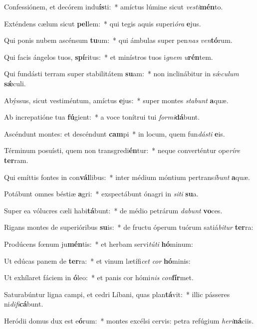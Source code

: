 \item Confessiónem, et decórem indu\textbf{ís}ti:~* amíctus lúmine sicut \textit{ves}\textit{ti}\textbf{mén}to.
\item Exténdens cælum sicut \textbf{pel}lem:~* qui tegis aquis superi\textit{ó}\textit{ra} \textbf{e}jus.
\item Qui ponis nubem ascénsum \textbf{tu}um:~* qui ámbulas super pen\textit{nas} \textit{ven}\textbf{tó}rum.
\item Qui facis ángelos tuos, \textbf{spí}ritus:~* et minístros tuos i\textit{gnem} \textit{u}\textbf{rén}tem.
\item Qui fundásti terram super stabilitátem \textbf{su}am:~* non inclinábitur in sǽ\textit{cu}\textit{lum} \textbf{sǽ}culi.
\item Abýssus, sicut vestiméntum, amíctus \textbf{e}jus:~* super montes \textit{sta}\textit{bunt} \textbf{a}quæ.
\item Ab increpatióne tua \textbf{fú}gient:~* a voce tonítrui tui \textit{for}\textit{mi}\textbf{dá}bunt.
\item Ascéndunt montes: et descéndunt \textbf{cam}pi~* in locum, quem fun\textit{dás}\textit{ti} \textbf{e}is.
\item Términum posuísti, quem non transgredi\textbf{én}tur:~* neque converténtur ope\textit{rí}\textit{re} \textbf{ter}ram.
\item Qui emíttis fontes in con\textbf{vál}libus:~* inter médium móntium pertrans\textit{í}\textit{bunt} \textbf{a}quæ.
\item Potábunt omnes béstiæ \textbf{a}gri:~* exspectábunt ónagri in \textit{si}\textit{ti} \textbf{su}a.
\item Super ea vólucres cæli habi\textbf{tá}bunt:~* de médio petrárum \textit{da}\textit{bunt} \textbf{vo}ces.
\item Rigans montes de superióribus \textbf{su}is:~* de fructu óperum tuórum satiá\textit{bi}\textit{tur} \textbf{ter}ra:
\item Prodúcens fœnum ju\textbf{mén}tis:~* et herbam servi\textit{tú}\textit{ti} \textbf{hó}minum:
\item Ut edúcas panem de \textbf{ter}ra:~* et vinum lætífi\textit{cet} \textit{cor} \textbf{hó}minis:
\item Ut exhílaret fáciem in \textbf{ó}leo:~* et panis cor hómi\textit{nis} \textit{con}\textbf{fír}met.
\item Saturabúntur ligna campi, et cedri Líbani, quas plan\textbf{tá}vit:~* illic pásseres ni\textit{di}\textit{fi}\textbf{cá}bunt.
\item Heródii domus dux est e\textbf{ó}rum:~* montes excélsi cervis: petra refúgium \textit{he}\textit{ri}\textbf{ná}ciis.
